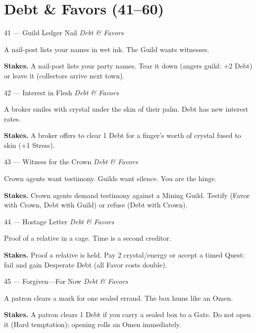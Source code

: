 \section{Debt \& Favors (41--60)}

\begin{encounterentry}{41 --- Guild Ledger Nail}
\textit{Debt \& Favors}

A nail-post lists your names in wet ink. The Guild wants witnesses.

\textbf{Stakes.} A nail-post lists your party names. Tear it down (angers guild: +2 Debt) or leave it (collectors arrive next town).
\end{encounterentry}

\begin{encounterentry}{42 --- Interest in Flesh}
\textit{Debt \& Favors}

A broker smiles with crystal under the skin of their palm. Debt has new interest rates.

\textbf{Stakes.} A broker offers to clear 1 Debt for a finger's worth of crystal fused to skin (+1 Stress).
\end{encounterentry}

\begin{encounterentry}{43 --- Witness for the Crown}
\textit{Debt \& Favors}

Crown agents want testimony. Guilds want silence. You are the hinge.

\textbf{Stakes.} Crown agents demand testimony against a Mining Guild. Testify (Favor with Crown, Debt with Guild) or refuse (Debt with Crown).
\end{encounterentry}

\begin{encounterentry}{44 --- Hostage Letter}
\textit{Debt \& Favors}

Proof of a relative in a cage. Time is a second creditor.

\textbf{Stakes.} Proof a relative is held. Pay 2 crystal/energy or accept a timed Quest: fail and gain Desperate Debt (all Favor costs double).
\end{encounterentry}

\begin{encounterentry}{45 --- Forgiven---For Now}
\textit{Debt \& Favors}

A patron clears a mark for one sealed errand. The box hums like an Omen.

\textbf{Stakes.} A patron clears 1 Debt if you carry a sealed box to a Gate. Do not open it (Hard temptation); opening rolls an Omen immediately.
\end{encounterentry}

